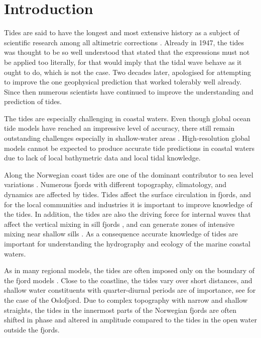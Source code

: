 \section{Introduction}

Tides are said to have the longest and most extensive history as a subject of scientific research among all altimetric corrections \cite[]{egbert94,cartwright77,hendershott81}. Already in 1947, the tides was thought to be so well understood that \cite{unna47} stated that the expressions must not be applied too literally, for that would imply that the tidal wave behave as it ought to do, which is not the case. Two decades later,  \cite{munk66} apologised for attempting to improve the one geophysical prediction that worked tolerably well already. Since then numerous scientists have continued to improve the understanding and prediction of tides. 

The tides are especially challenging in coastal waters. Even though global ocean tide models have reached an impressive level of accuracy, there still remain outstanding challenges especially in shallow-water areas \cite[]{stammer14}. 
High-resolution global models cannot be expected to produce accurate tide predictions in coastal waters due to lack of local bathymetric data and local tidal knowledge. 

Along the Norwegian coast tides are one of the dominant contributor to sea level variations \cite[]{grabbe09}. Numerous fjords with different topography, climatology, and dynamics are affected by tides. Tides affect the surface circulation in fjords, and for the local communities and industries it is important to improve knowledge of the tides. In addition, the tides are also the driving force for internal waves that affect the vertical mixing in sill fjords \cite[]{stigebrandt76}, and can generate zones of intensive mixing near shallow sills \cite[]{staal15}. As a consequence accurate knowledge of tides are important for understanding the hydrography and ecology of the marine coastal waters.

As in many regional models, the tides are often imposed only on the boundary of the fjord models \cite[]{gjevik89,carniello05,lynge13}. Close to the coastline, the tides vary over short distances, and shallow water constituents with quarter-diurnal periods are of importance, see \cite{trygg74} for the case of the Oslofjord. Due to complex topography with narrow and shallow straights, 
the tides in the innermost parts of the Norwegian fjords are often shifted in phase and altered in amplitude compared to the tides in the open water outside the fjords. 

